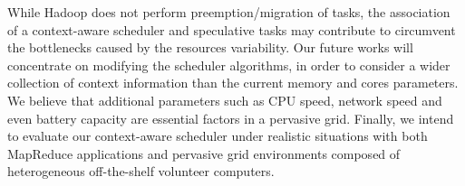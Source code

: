While Hadoop does not perform preemption/migration of tasks, the association of a context-aware scheduler and speculative tasks may contribute to circumvent the bottlenecks caused by the resources variability. Our future works will concentrate on modifying the scheduler algorithms, in order to consider a wider collection of context information than the current memory and cores parameters. We believe that additional parameters such as CPU speed, network speed and even battery capacity are essential factors in a pervasive grid. Finally, we intend to evaluate our context-aware scheduler under realistic situations with both MapReduce applications and pervasive grid environments composed of heterogeneous off-the-shelf volunteer computers.   





